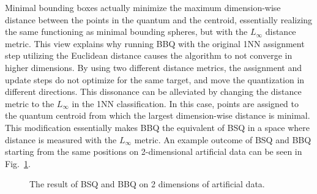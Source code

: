 			Minimal bounding boxes actually minimize the maximum dimension-wise distance between the points in the quantum and the centroid, essentially realizing the same functioning as minimal bounding spheres, but with the $L_\infty$ distance metric.
			This view explains why running \ac{BBQ} with the original \ac{1NN} assignment step utilizing the Euclidean distance causes the algorithm to not converge in higher dimensions.
			By using two different distance metrics, the assignment and update steps do not optimize for the same target, and move the quantization in different directions.
			This dissonance can be alleviated by changing the distance metric to the $L_\infty$ in the \ac{1NN} classification.
			In this case, points are assigned to the quantum centroid from which the largest dimension-wise distance is minimal.
			This modification essentially makes \ac{BBQ} the equivalent of \ac{BSQ} in a space where distance is measured with the $L_\infty$ metric.
			An example outcome of \ac{BSQ} and \ac{BBQ} starting from the same positions on 2-dimensional artificial data can be seen in Fig.~\ref{fig:bsqbbqexample}.
	
			\begin{figure}[ht]
				\centering
				\caption[BSQ and BBQ examples]{The result of BSQ and BBQ on 2 dimensions of artificial data.}
				\label{fig:bsqbbqexample}
			\end{figure}
			
